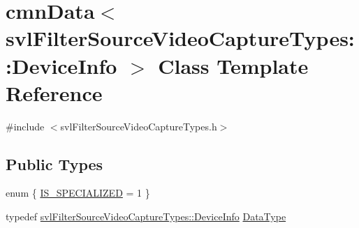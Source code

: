 \hypertarget{classcmn_data_3_01svl_filter_source_video_capture_types_1_1_device_info_01_4}{}\section{cmn\+Data$<$ svl\+Filter\+Source\+Video\+Capture\+Types\+:\+:Device\+Info $>$ Class Template Reference}
\label{classcmn_data_3_01svl_filter_source_video_capture_types_1_1_device_info_01_4}


{\ttfamily \#include $<$svl\+Filter\+Source\+Video\+Capture\+Types.\+h$>$}

\subsection*{Public Types}
\begin{DoxyCompactItemize}
\item 
enum \{ \hyperlink{classcmn_data_3_01svl_filter_source_video_capture_types_1_1_device_info_01_4_ad534b4c963e58d6f18344d076221d3cfabab1017c2f050ed948aceb6bb647ac49}{I\+S\+\_\+\+S\+P\+E\+C\+I\+A\+L\+I\+Z\+E\+D} = 1
 \}
\item 
typedef \hyperlink{classsvl_filter_source_video_capture_types_1_1_device_info}{svl\+Filter\+Source\+Video\+Capture\+Types\+::\+Device\+Info} \hyperlink{classcmn_data_3_01svl_filter_source_video_capture_types_1_1_device_info_01_4_afce8b1b6d893ddc5d505f2f1574ac4af}{Data\+Type}
\end{DoxyCompactItemize}
